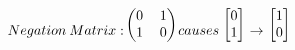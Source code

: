 \documentclass[12pt]{article}
\begin{document}
$$
Negation\:Matrix: 
\begin{blockarray}{cc}
\begin{block}{(cc)}
0 & 1\\
1 & 0\\
\end{block}
\end{blockarray}
 \:causes\:
\begin{blockarray}{c}
\begin{block}{[c]}
0\\
1\\
\end{block}
\end{blockarray}
\rightarrow
\begin{blockarray}{c}
\begin{block}{[c]}
1\\
0\\
\end{block}
\end{blockarray}
$$
\end{document}

